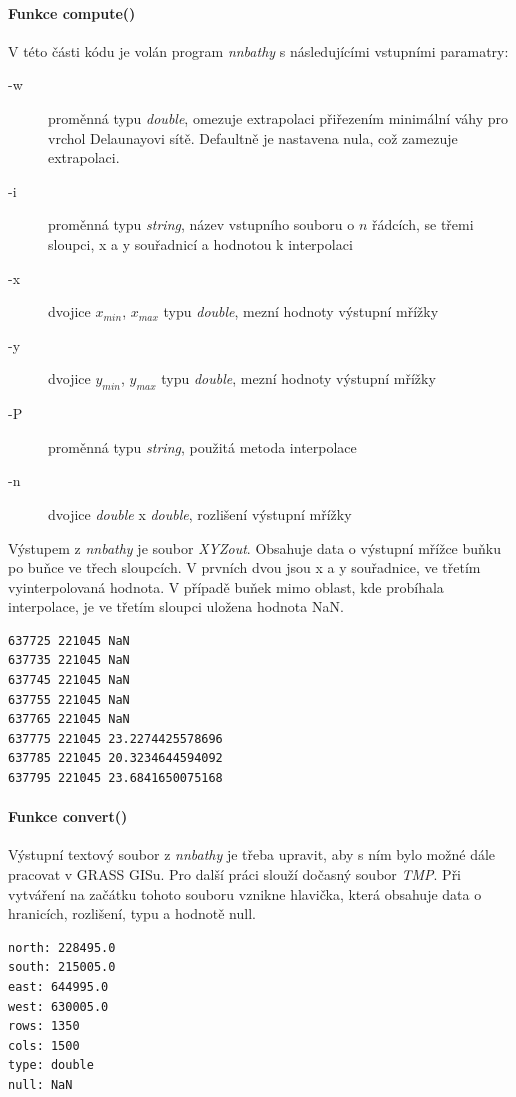 \documentclass[12pt,a4paper]{article}
\begin{document}
\bigskip
\paragraph{Funkce compute()}
V této části kódu je volán program \emph{nnbathy} s následujícími vstupními paramatry:
\begin{description}
\item[-w]{proměnná typu \emph{double}, omezuje extrapolaci přiřezením minimální váhy pro vrchol Delaunayovi sítě. Defaultně je nastavena nula, což zamezuje extrapolaci.}
\item[-i]{proměnná typu \emph{string}, název vstupního souboru o $n$ řádcích, se třemi sloupci, x a y souřadnicí a hodnotou k interpolaci}
\item[-x]{dvojice $x_{min}$, $x_{max}$ typu \emph{double}, mezní hodnoty výstupní mřížky}
\item[-y]{dvojice $y_{min}$, $y_{max}$ typu \emph{double}, mezní hodnoty výstupní mřížky}
\item[-P]{proměnná typu \emph{string}, použitá metoda interpolace}
\item[-n]{dvojice \emph{double} x \emph{double}, rozlišení výstupní mřížky}
\end{description}

Výstupem z \emph{nnbathy} je soubor \emph{XYZout}. Obsahuje data o výstupní mřížce buňku po buňce ve třech sloupcích. V prvních dvou jsou x a y souřadnice, ve třetím vyinterpolovaná hodnota. V případě buňek mimo oblast, kde probíhala interpolace, je ve třetím sloupci uložena hodnota NaN.

\bigskip
\lstset{basicstyle=\footnotesize}
\begin{lstlisting}[caption={XYZout}]
637725 221045 NaN
637735 221045 NaN
637745 221045 NaN
637755 221045 NaN
637765 221045 NaN
637775 221045 23.2274425578696
637785 221045 20.3234644594092
637795 221045 23.6841650075168
\end{lstlisting}

\bigskip
\paragraph{Funkce convert()}
Výstupní textový soubor z \emph{nnbathy} je třeba upravit, aby s ním bylo možné dále pracovat v GRASS GISu. Pro další práci slouží dočasný soubor \emph{TMP}. Při vytváření na začátku tohoto souboru vznikne hlavička, která obsahuje data o hranicích, rozlišení, typu a hodnotě null.

\newpage
\lstset{basicstyle=\ttfamily}
\begin{lstlisting}[caption={Hlavička souboru TMP}]
north: 228495.0
south: 215005.0
east: 644995.0
west: 630005.0
rows: 1350
cols: 1500
type: double
null: NaN
\end{lstlisting}
\end{document}
